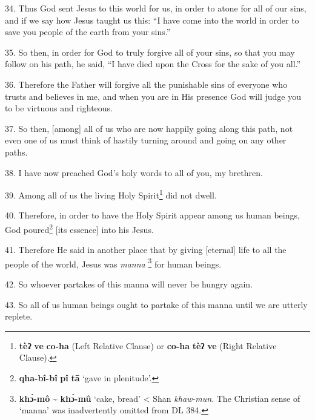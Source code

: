 34. Thus God sent Jesus to this world for us, in order to atone for all of our
sins, and if we say how Jesus taught us this: ``I have come into the world in order
to save you people of the earth from your sins.''

35. So then, in order for God to truly forgive all of your sins, so that you may
follow on his path, he said, ``I have died upon the Cross for the sake of you all.''

36. Therefore the Father will forgive all the punishable sins of everyone who trusts
and believes in me, and when you are in His presence God will judge you to be virtuous
and righteous.

37. So then, [among] all of us who are now happily going along this path, not even
one of us must think of hastily turning around and going on any other paths.

38. I have now preached God's holy words to all of you, my brethren.

39. Among all of us the living Holy Spirit\footnote{\textbf{tèʔ} \textbf{ve} \textbf{co-ha} (Left Relative Clause) or \textbf{co-ha} \textbf{tèʔ} \textbf{ve} (Right Relative Clause).} did not dwell.

40. Therefore, in order to have the Holy Spirit appear among us human beings, God
poured\footnote{\textbf{qha-bî-bî} \textbf{pî} \textbf{tā} `gave in plenitude'.} [its essence] into his Jesus.

41. Therefore He said in another place that by giving [eternal] life to all the
people of the world, Jesus was \textit{manna} \footnote{\textbf{khɔ̀-mô} \textasciitilde{ \textbf{khɔ̀-mû}} `cake, bread' < Shan \textit{khaw-mun}. The Christian sense of `manna' was inadvertently omitted from DL 384.} for human beings.

42. So whoever partakes of this manna will never be hungry again.

43. So all of us human beings ought to partake of this manna until we are utterly replete.

